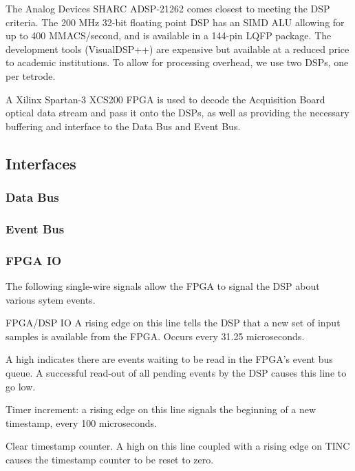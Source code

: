  The Analog Devices SHARC ADSP-21262 comes closest to meeting
the DSP criteria. The 200 MHz 32-bit floating point DSP has an SIMD
ALU allowing for up to 400 MMACS/second, and is available in a 144-pin
LQFP package. The development tools (VisualDSP++) are expensive but
available at a reduced price to academic institutions. To allow for
processing overhead, we use two DSPs, one per tetrode.  
      
A Xilinx Spartan-3 XCS200 FPGA is used to decode the Acquisition Board
optical data stream and pass it onto the DSPs, as well as providing
the necessary buffering and interface to the Data Bus and Event Bus.
      
\subsection{Interfaces}

\subsubsection{Data Bus}

\subsubsection{Event Bus}

\subsubsection{FPGA IO}
The following single-wire signals allow the FPGA to
signal the DSP about various sytem events. 


\begin{SignalTable}{FPGA/DSP IO}
  {A rising edge on this line tells the DSP that a
    new set of input samples is available from the
    FPGA. Occurs  every 31.25 microseconds.
  }
  
  {A high indicates there are events waiting to be
    read in the FPGA's event bus queue. A successful
    read-out of all pending events by the DSP causes this
    line to go low. 
  }
        
  {Timer increment: a rising edge on this line
    signals the beginning of a new timestamp, every 100
    microseconds. 
  }
        
  {Clear timestamp counter. A high on this line
    coupled with a rising edge on TINC causes the timestamp
    counter to be reset to zero.
  }
\end{SignalTable}

